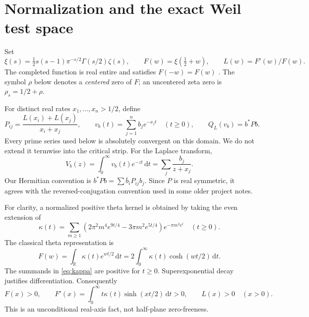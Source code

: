 \documentclass[11pt,letterpaper]{article}
\theoremstyle{definition}
\theoremstyle{remark}
\newcommand{\R}{\mathbb R}
\newcommand{\dd}{\,\mathrm d}
\numberwithin{equation}{section}
\begin{document}
\section{Normalization and the exact Weil test space}

Set
\begin{equation}\label{eq:xi}
 \xi(s)=\tfrac12s(s-1)\pi^{-s/2}\Gamma(s/2)\zeta(s),\qquad
 F(w)=\xi(\tfrac12+w),\qquad L(w)=F'(w)/F(w).
\end{equation}
The completed function is real entire and satisfies $F(-w)=F(w)$ \cite{dlmf}. The symbol $\rho$ below denotes a \emph{centered} zero of $F$; an uncentered zeta zero is $\rho_s=1/2+\rho$.

For distinct real rates $x_1,\ldots,x_n>1/2$, define
\begin{equation}\label{eq:pick}
 P_{ij}=\frac{L(x_i)+L(x_j)}{x_i+x_j},\qquad
 v_b(t)=\sum_{j=1}^n b_j e^{-x_jt}\quad(t\ge0),\qquad
 Q_L(v_b)=b^*Pb.
\end{equation}
Every prime series used below is absolutely convergent on this domain. We do not extend it termwise into the critical strip. For the Laplace transform,
\begin{equation}\label{eq:V}
 V_b(z)=\int_0^\infty v_b(t)e^{-zt}\dd t
       =\sum_j\frac{b_j}{z+x_j}.
\end{equation}
Our Hermitian convention is $b^*Pb=\sum\overline b_i P_{ij}b_j$. Since $P$ is real symmetric, it agrees with the reversed-conjugation convention used in some older project notes.

For clarity, a normalized positive theta kernel is obtained by taking the even extension of
\begin{equation}\label{eq:kappa}
 \kappa(t)=\sum_{m\ge1}
 \left(2\pi^2m^4e^{9t/4}-3\pi m^2e^{5t/4}\right)e^{-\pi m^2e^t}
 \quad(t\ge0).
\end{equation}
The classical theta representation is
\begin{equation}\label{eq:theta}
 F(w)=\int_{\R}\kappa(t)e^{wt/2}\dd t
     =2\int_0^\infty\kappa(t)\cosh(wt/2)\dd t.
\end{equation}
The summands in \eqref{eq:kappa} are positive for $t\ge0$. Superexponential decay justifies differentiation. Consequently
\begin{equation}\label{eq:Lpositive}
 F(x)>0,\qquad F'(x)=\int_0^\infty t\kappa(t)\sinh(xt/2)\dd t>0,
 \qquad L(x)>0\quad(x>0).
\end{equation}
This is an unconditional real-axis fact, not half-plane zero-freeness.
\end{document}
